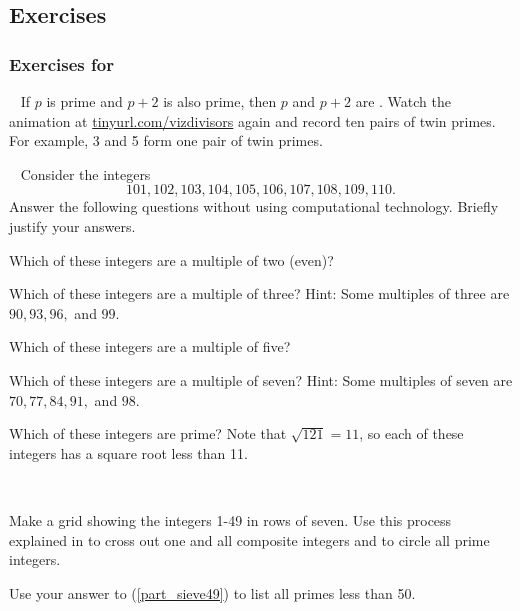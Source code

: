 
\subsection{Exercises}


\subsubsection*{Exercises for  \subprimes}

\begin{exer}[\exerP] %
\label{exer_twin_primes}
~    
    If $p$ is prime and $p+2$ is also prime, then $p$ and $p+2$ are . Watch the animation at \url{tinyurl.com/vizdivisors} again and record ten pairs of twin primes.  For example, 3 and 5 form one pair of twin primes.
\end{exer}

\begin{exer}[\exerP] %
\label{exer_101_110_prime}
~  
    Consider the integers $$101, 102, 103, 104, 105, 106, 107, 108, 109, 110.$$  Answer the following questions without using computational technology. Briefly justify your answers.
        \begin{exerpart}
            \item Which of these integers are a multiple of two (even)?
            \item Which of these integers are a multiple of three?  Hint: Some multiples of three are $90, 93, 96,$ and $99$.
            \item Which of these integers are a multiple of five?
            \item Which of these integers are a multiple of seven?  Hint: Some multiples of seven are $70, 77, 84, 91,$ and $98$.
            \item Which of these integers are prime? Note that $\sqrt{121} = 11$, so each of these integers has a square root less than 11.
        \end{exerpart}
\end{exer}

\begin{exer}[\exerP] %
\label{exer_sieve}
~
    \begin{apart}
        \item \label{part_sieve49} Make a grid showing the integers 1-49 in rows of seven.  Use this process explained in  to cross out one and all composite integers and to circle all prime integers.
        \item Use your answer to (\ref{part_sieve49}) to list all primes less than 50.
    \end{apart}
\end{exer}

